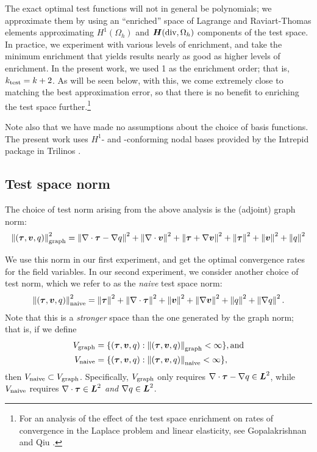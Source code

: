 The exact optimal test functions will not in general be polynomials; we approximate them by using an ``enriched'' space of Lagrange and Raviart-Thomas elements approximating $H^{1}(\Omega_{h})$ and $\vect{H}(\text{\rm div},\Omega_{h})$ components of the test space.  In practice, we experiment with various levels of enrichment, and take the minimum enrichment that yields results nearly as good as higher levels of enrichment.  In the present work, we used 1 as the enrichment order; that is, $k_{\rm test} = k+2$.  As will be seen below, with this, we come extremely close to matching the best approximation error, so that there is no benefit to enriching the test space further.\footnote{For an analysis of the effect of the test space enrichment on rates of convergence in the Laplace problem and linear elasticity, see Gopalakrishnan and Qiu \cite{GopalakrishnanQiu11}.}

Note also that we have made no assumptions about the choice of basis functions.  The present work uses $H^{1}$- and \NVRHdiv-conforming nodal bases provided by the Intrepid package in Trilinos \cite{Trilinos}.

\subsection{Test space norm}
The choice of test norm arising from the above analysis is the (adjoint) graph norm:
\begin{align*}
\norm{(\NVRtensor{\tau},\vect{v}, q)}_{\rm graph}^{2} = \norm{\NVRdiv \NVRtensor{\tau} - \NVRgrad q}^{2} + \norm{\NVRdiv \vect{v}}^{2} + \norm{ \NVRtensor{\tau} + \NVRgrad{\vect{v}}}^{2} + \norm{\NVRtensor{\tau}}^{2} + \norm{\vect{v}}^{2} + \norm{q}^{2}
\end{align*}

We use this norm in our first experiment, and get the optimal convergence rates for the field variables.  In our second experiment, we consider another choice of test norm, which we refer to as the \emph{naive} test space norm:
\begin{align*}
\norm{(\NVRtensor{\tau},\vect{v}, q)}_{\rm naive}^{2} = \norm{\NVRtensor{\tau}}^{2} + \norm{\NVRdiv \NVRtensor{\tau}}^{2} + \norm{\vect{v}}^{2} + \norm{\NVRgrad \vect{v}}^{2} + \norm{q}^{2} + \norm{\NVRgrad q}^{2}.
\end{align*}
Note that this is a \emph{stronger} space than the one generated by the graph norm; that is, if we define
\begin{align*}
\V_{\rm graph} &= \{ (\NVRtensor{\tau},\vect{v}, q) : \norm{(\NVRtensor{\tau},\vect{v}, q)}_{\rm graph} < \infty \}, \text{and} \\
\V_{\rm naive} &= \{ (\NVRtensor{\tau},\vect{v}, q) : \norm{(\NVRtensor{\tau},\vect{v}, q)}_{\rm naive} < \infty \},
\end{align*}
then $V_{\rm naive} \subset V_{\rm graph}$.  Specifically, $V_{\rm graph}$ only requires $\NVRdiv \NVRtensor{\tau} - \NVRgrad q \in \vect{L}^{2}$, while $V_{\rm naive}$ requires $\NVRdiv \NVRtensor{\tau} \in \vect{L}^{2}$ \emph{and} $\NVRgrad q \in \vect{L}^{2}$.

